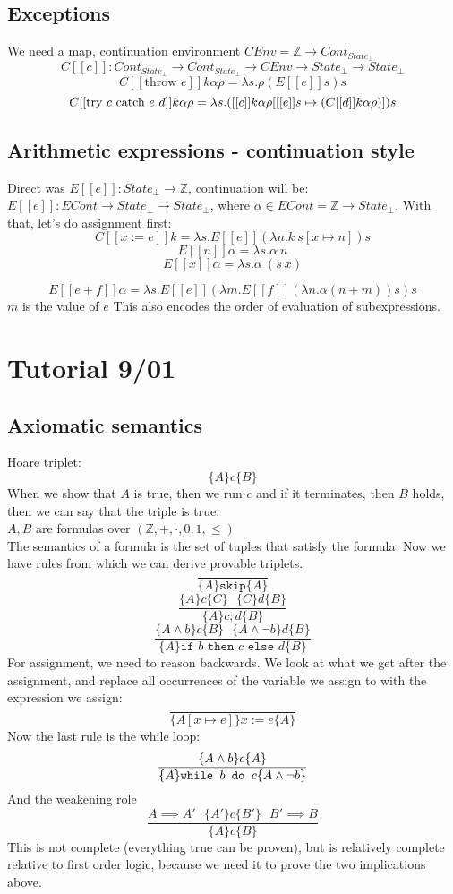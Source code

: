 \documentclass{article}
\begin{document}
\subsection{Exceptions}
We need a map, continuation environment 
$ CEnv=\mathbb{Z} \rightarrow Cont_{State_\bot} $
$$C[[c]]:Cont_{State_\bot} \rightarrow Cont_{State_\bot}  \rightarrow CEnv \rightarrow State_\bot \rightarrow State_\bot$$
$$C[[\text{throw } e]]k\alpha\rho=\lambda s.\rho(E[[e]]s)s$$
$$C[[\text{try $ c $ catch $ e\ d $}]]k\alpha\rho=\lambda s.([[c]]k\alpha\rho[[[e]]s\mapsto(C[[d]]k\alpha\rho)])s$$
\subsection{Arithmetic expressions - continuation style}
Direct was $ E[[e]]:State_\bot \rightarrow \mathbb{Z} $, continuation will be: $ E[[e]] : ECont \rightarrow State_\bot \rightarrow State_\bot$, where $\alpha\in ECont=\mathbb{Z} \rightarrow State_\bot $.
With that, let's do assignment first:
$$C[[x:=e]]k=\lambda s.E[[e]](\lambda n.k\ s[x\mapsto n])s$$
$$ E[[n]]\alpha =\lambda s.\alpha\ n$$
$$ E[[x]]\alpha =\lambda s.\alpha\ (s\ x)$$

$$ E[[e+f]]\alpha =\lambda s.E[[e]](\lambda m.E[[f]](\lambda n.\alpha(n+m))s)s$$
$ m  $ is the value of $ e $
This also encodes the order of evaluation of subexpressions.
\section{Tutorial 9/01}
\subsection{Axiomatic semantics}
Hoare triplet:
$$\{A\}c\{B\}$$
When we show that $A$ is true, then we run $c$ and if it terminates, then $ B $ holds, then we can say that the triple is true.\\
$ A, B $ are formulas over $ (\mathbb{Z}, +, \cdot, 0, 1, \le) $\\
The semantics of a formula is the set of tuples that satisfy the formula.
Now we have rules from which we can derive provable triplets.
$$\frac{}{\{A\}\texttt{skip}\{A\}}$$
$$\frac{
	\{A\}c\{C\}\ \ \ 
	\{C\}d\{B\}
}{
	\{A\}c;d\{B\}
}$$
$$\frac{
	\{A\wedge b\}c\{B\}\ \ \ 
	\{A\wedge \neg b\}d\{B\}
}{
	\{A\}\texttt{if $b$ then $c$ else $d$}\{B\}
}$$
For assignment, we need to reason backwards. We look at what we get after the assignment, and replace all occurrences of the variable we assign to with the expression we assign:
$$\frac{}{\{A[x\mapsto e]\}x:=e\{A\}}$$
Now the last rule is the while loop:
$$\frac{
	\{A\wedge b\}c\{A\}
}{
	\{A\}\texttt{while $ b $ do $ c $}\{A \wedge \neg b\}
}$$
And the weakening role
$$\frac{
	A\implies A'\ \ \ 
	\{A'\}c\{B'\}\ \ \ 
	B'\implies B
}{
	\{A\}c\{B\}
}$$
This is not complete (everything true can be proven), but is relatively complete relative to first order logic, because we need it to prove the two implications above.
\end{document}
